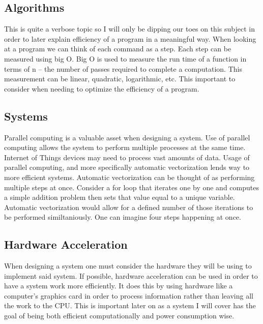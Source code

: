 \documentclass{sig-alternate}
\begin{document}

\subsection{Algorithms}
\label{sec:algorithms}

This is quite a verbose topic so I will only be dipping our toes on this subject in order to later explain efficiency of a program in a meaningful way. When looking at a program we can think of each command as a step. Each step can be measured using big O. Big O is used to measure the run time of a function in terms of n -- the number of passes required to complete a computation. This measurement can be linear, quadratic, logarithmic, etc. This important to consider when needing to optimize the efficiency of a program. 

\subsection{Systems}
\label{sec:systems}

Parallel computing is a valuable asset when designing a system. Use of parallel computing allows the system to perform multiple processes at the same time. Internet of Things devices may need to process vast amounts of data. Usage of parallel computing, and more specifically automatic vectorization lends way to more efficient systems. Automatic vectorization can be thought of as performing multiple steps at once. Consider a for loop that iterates one by one and computes a simple addition problem then sets that value equal to a unique variable. Automatic vectorization would allow for a defined number of those iterations to be performed similtaniously. One can imagine four  steps happening at once.

\subsection{Hardware Acceleration}
\label{sec:hardwareAcceleration}

When designing a system one must consider the hardware they will be using to implement said system. If possible, hardware acceleration can be used in order to have a system work more efficiently. It does this by using hardware like a computer's graphics card in order to process information rather than leaving all the work to the CPU. This is important later on as a system I will cover has the goal of being both efficient computationally and power consumption wise.
\end{document}
